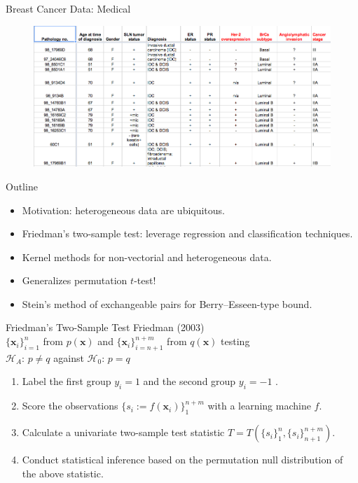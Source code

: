 \documentclass{beamer}
\begin{document}
\begin{frame}{Breast Cancer Data: Medical}
  \begin{figure}
    \centering
    \includegraphics[scale=.5]{medical.png}
  \end{figure}
\end{frame}

\begin{frame}{Outline}
  \begin{itemize}
  \item Motivation: heterogeneous data are ubiquitous. \pause
  \item Friedman's two-sample test: leverage regression and classification techniques. \pause
  \item Kernel methods for non-vectorial and heterogeneous data. \pause
  \item Generalizes permutation $t$-test! \pause
  \item Stein's method of exchangeable pairs for Berry--Esseen-type bound.
  \end{itemize}
\end{frame}

\begin{frame}{Friedman's Two-Sample Test}
  Friedman (2003) \\
  $\{\mathbf{x}_i\}_{i=1}^n$ from $p(\mathbf{x})$ and
  $\{\mathbf{x}_i\}_{i=n+1}^{n+m}$ from $q(\mathbf{x})$ testing \\
  $\mathcal{H}_A$: $p \neq q$ against $\mathcal{H}_0$: $p = q$ \pause
  \begin{enumerate}
  \item Label the first group $y_i = 1$ and the second group $y_i = -1$ . \pause
  \item Score the observations $\{s_i := f(\mathbf{x}_i)\}_1^{n+m}$ with a learning machine $f$. \pause
  \item Calculate a univariate two-sample test statistic
    $T = T(\{s_i\}_1^n,\{s_i\}_{n+1}^{n+m})$. \pause
  \item Conduct statistical inference based on the permutation null distribution of the above
    statistic.
  \end{enumerate}
\end{frame}
\end{document}
